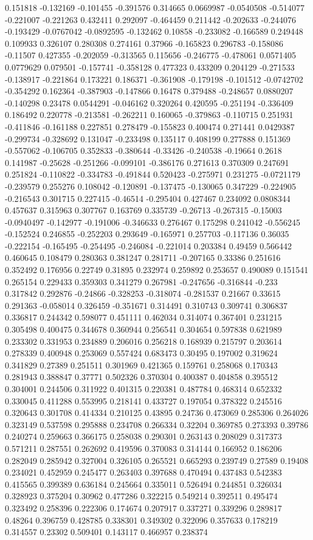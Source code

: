 0.151818 -0.132169 -0.101455 -0.391576 0.314665 0.0669987 -0.0540508 -0.514077 -0.221007 -0.221263 0.432411 0.292097 -0.464459 0.211442 -0.202633 -0.244076 -0.193429 -0.0767042 -0.0892595 -0.132462 0.10858 -0.233082 -0.166589 0.249448 0.109933 0.326107 0.280308 0.274161 0.37966 -0.165823 0.296783 -0.158086 -0.11507 0.427355 -0.202059 -0.313565 0.115656 -0.246775 -0.478061 0.0571405 0.0779629 0.079501 -0.157741 -0.358128 0.477323 0.433209 0.204129 -0.271533 -0.138917 -0.221864 0.173221 0.186371 -0.361908 -0.179198 -0.101512 -0.0742702 -0.354292 0.162364 -0.387903 -0.147866 0.16478 0.379488 -0.248657 0.0880207 -0.140298 0.23478 0.0544291 -0.046162 0.320264 0.420595 -0.251194 -0.336409 0.186492 0.220778 -0.213581 -0.262211 0.160065 -0.379863 -0.110715 0.251931 -0.411846 -0.161188 0.227851 0.278479 -0.155823 0.400474 0.271441 0.0429387 -0.299734 -0.328692 0.131047 -0.233498 0.135117 0.408199 0.277888 0.151369 -0.557062 -0.106705 0.352833 -0.380644 -0.33426 -0.240538 -0.19664 0.2618 0.141987 -0.25628 -0.251266 -0.099101 -0.386176 0.271613 0.370309 0.247691 0.251824 -0.110822 -0.334783 -0.491844 0.520423 -0.275971 0.231275 -0.0721179 -0.239579 0.255276 0.108042 -0.120891 -0.137475 -0.130065 0.347229 -0.224905 -0.216543 0.301715 0.227415 -0.46514 -0.295404 0.427467 0.234092 0.0808344 0.457637 0.315963 0.307767 0.163769 0.335739 -0.26713 -0.267315 -0.15003 -0.0940497 -0.142977 -0.191006 -0.346633 0.276467 0.175298 0.241042 -0.556245 -0.152524 0.246855 -0.252203 0.293649 -0.165971 0.257703 -0.117136 0.36035 -0.222154 -0.165495 -0.254495 -0.246084 -0.221014 0.203384 0.49459 0.566442 0.460645 0.108479 0.280363 0.381247 0.281711 -0.207165 0.33386 0.251616 0.352492 0.176956 0.22749 0.31895 0.232974 0.259892 0.253657 0.490089 0.151541 0.265154 0.229433 0.359303 0.341279 0.267981 -0.247656 -0.316844 -0.233 0.317842 0.292876 -0.24866 -0.328253 -0.318074 -0.281537 0.21667 0.33615 0.291363 -0.058014 0.326459 -0.351671 0.314491 0.310743 0.309741 0.306837 0.336817 0.244342 0.598077 0.451111 0.462034 0.314074 0.367401 0.231215 0.305498 0.400475 0.344678 0.360944 0.256541 0.304654 0.597838 0.621989 0.233302 0.331953 0.234889 0.206016 0.256218 0.168939 0.215797 0.203614 0.278339 0.400948 0.253069 0.557424 0.683473 0.30495 0.197002 0.319624 0.341829 0.27389 0.251511 0.301969 0.421365 0.159761 0.258068 0.170343 0.281943 0.388847 0.37771 0.502326 0.370304 0.400387 0.404858 0.395512 0.304001 0.244506 0.311922 0.401315 0.220381 0.487784 0.468314 0.652332 0.330045 0.411288 0.553995 0.218141 0.433727 0.197054 0.378322 0.245516 0.320643 0.301708 0.414334 0.210125 0.43895 0.24736 0.473069 0.285306 0.264026 0.323149 0.537598 0.295888 0.234708 0.266334 0.32204 0.369785 0.273393 0.39786 0.240274 0.259663 0.366175 0.258038 0.290301 0.263143 0.208029 0.317373 0.571211 0.287551 0.262692 0.419596 0.370083 0.314144 0.166952 0.186206 0.282049 0.285942 0.327004 0.326105 0.265521 0.665293 0.239749 0.27589 0.19408 0.234021 0.452959 0.245477 0.263403 0.397688 0.470494 0.437483 0.542383 0.415565 0.399389 0.636184 0.245664 0.335011 0.526494 0.244851 0.326034 0.328923 0.375204 0.30962 0.477286 0.322215 0.549214 0.392511 0.495474 0.323492 0.258396 0.222306 0.174674 0.207917 0.337271 0.339296 0.289817 0.48264 0.396759 0.428785 0.338301 0.349302 0.322096 0.357633 0.178219 0.314557 0.23302 0.509401 0.143117 0.466957 0.238374 